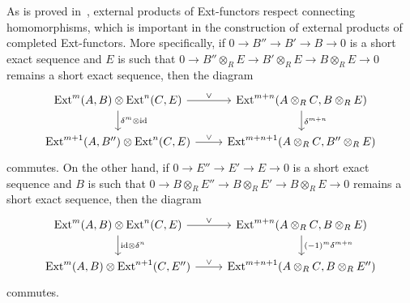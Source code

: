 \documentclass[12pt, a4paper]{article}
\numberwithin{equation}{section}
\theoremstyle{empty}
\theoremstyle{nonumberplain}
\begin{document}
As is proved in~\cite[p.~110--111]{bro82}, external products of Ext-functors respect connecting homomorphisms, which is important in the construction of external products of completed Ext-functors. More specifically, if $0 \rightarrow B'' \rightarrow B' \rightarrow B \rightarrow 0$ is a short exact sequence and $E$ is such that $0 \rightarrow B'' \otimes_R E \rightarrow B' \otimes_R E \rightarrow B \otimes_R E \rightarrow 0$ remains a short exact sequence, then the diagram
\begin{equation}\label{diag:extandconnfirst}
\begin{tikzcd}
    \mathrm{Ext}^m(A{,} \, B) \otimes \mathrm{Ext}^n(C{,} \, E) \arrow[r, "\vee"] \arrow[d, "\delta^m \otimes \mathrm{id}"] & \mathrm{Ext}^{m+n}(A \otimes_R C{,} \, B \otimes_R E) \arrow[d, "\delta^{m+n}"] \\
    \mathrm{Ext}^{m+1}(A{,} \, B'') \otimes \mathrm{Ext}^n(C{,} \, E) \arrow[r, "\vee"] & \mathrm{Ext}^{m+n+1}(A \otimes_R C{,} \, B'' \otimes_R E)
\end{tikzcd}
\end{equation}
commutes. On the other hand, if $0 \rightarrow E'' \rightarrow E' \rightarrow E \rightarrow 0$ is a short exact sequence and $B$ is such that $0 \rightarrow B \otimes_R E'' \rightarrow B \otimes_R E' \rightarrow B \otimes_R E \rightarrow 0$ remains a short exact sequence, then the diagram
\begin{equation}\label{diag:extandconnsecond}
\begin{tikzcd}
    \mathrm{Ext}^m(A{,} \, B) \otimes \mathrm{Ext}^n(C{,} \, E) \arrow[r, "\vee"] \arrow[d, "\mathrm{id} \otimes \delta^n"] & \mathrm{Ext}^{m+n}(A \otimes_R C{,} \, B \otimes_R E) \arrow[d, "(-1)^m \delta^{m+n}"] \\
    \mathrm{Ext}^m(A{,} \, B) \otimes \mathrm{Ext}^{n+1}(C{,} \, E'') \arrow[r, "\vee"] & \mathrm{Ext}^{m+n+1}(A \otimes_R C{,} \, B \otimes_R E'')
\end{tikzcd}
\end{equation}
commutes. \\
\end{document}
